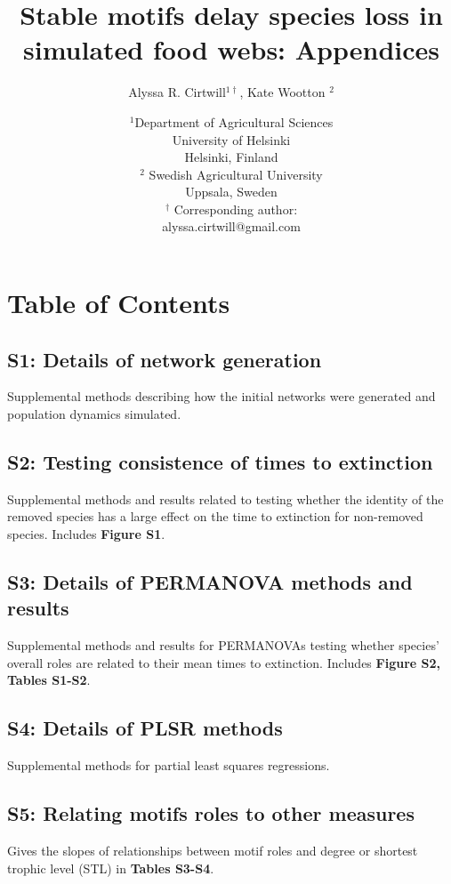 \documentclass[12pt]{article}
\title{Stable motifs delay species loss in simulated food webs: Appendices}
\author{Alyssa R. Cirtwill$^{1\dagger}$, Kate Wootton $^{2}$}
\date{\small$^1$Department of Agricultural Sciences\\ 
University of Helsinki\\
Helsinki, Finland\\
\medskip
\small$^2$ Swedish Agricultural University\\
Uppsala, Sweden\\
\medskip
$^\dagger$ Corresponding author:\\
alyssa.cirtwill@gmail.com\\
 }
\begin{document}
 
\maketitle 
\raggedright
\setlength{\parindent}{15pt} 

\section*{Table of Contents}

    \subsection*{S1: Details of network generation}

        Supplemental methods describing how the initial networks were generated and population dynamics simulated.

    \subsection*{S2: Testing consistence of times to extinction}
    
        Supplemental methods and results related to testing whether the identity of the removed species has a large effect on the time to extinction for non-removed species. Includes \textbf{Figure S1}.
    
    \subsection*{S3: Details of PERMANOVA methods and results}
        
        Supplemental methods and results for PERMANOVAs testing whether species' overall roles are related to their mean times to extinction. Includes \textbf{Figure S2, Tables S1-S2}.

    \subsection*{S4: Details of PLSR methods}

        Supplemental methods for partial least squares regressions. 
    
    \subsection*{S5: Relating motifs roles to other measures}
        
        Gives the slopes of relationships between motif roles and degree or shortest trophic level (STL) in \textbf{Tables S3-S4}.
        
\end{document}
